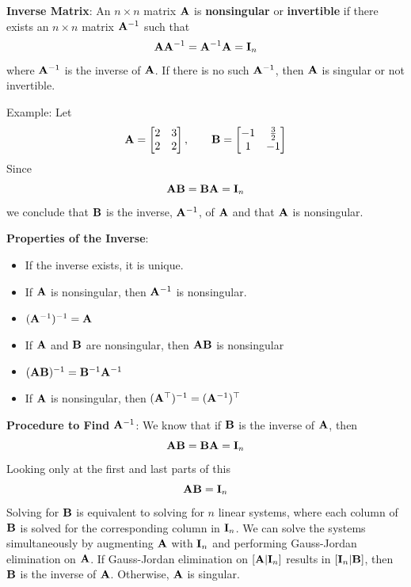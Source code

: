 \documentclass[
  letterpaper,
]{book}
\theoremstyle{definition}
\theoremstyle{definition}
\theoremstyle{plain}
\theoremstyle{definition}
\theoremstyle{plain}
\theoremstyle{plain}
\theoremstyle{remark}
\begin{document}
\textbf{Inverse Matrix}: An \(n\times n\) matrix \({\bf A}\) is
\textbf{nonsingular} or \textbf{invertible} if there exists an
\(n\times n\) matrix \({\bf A}^{-1}\) such that
\[{\bf A} {\bf A}^{-1} = {\bf A}^{-1} {\bf A} = {\bf I}_n\] where
\({\bf A}^{-1}\) is the inverse of \({\bf A}\). If there is no such
\({\bf A}^{-1}\), then \({\bf A}\) is singular or not invertible.

Example: Let
\[{\bf A} = \begin{bmatrix} 2&3\\2&2 \end{bmatrix}, \qquad {\bf B}=\begin{bmatrix} -1&\frac{3}{2}\\ 1&-1
        \end{bmatrix}\] Since
\[{\bf A} {\bf B} = {\bf B} {\bf A} = {\bf I}_n\] we conclude that
\({\bf B}\) is the inverse, \({\bf A}^{-1}\), of \({\bf A}\) and that
\({\bf A}\) is nonsingular.

\textbf{Properties of the Inverse}:

\begin{itemize}
\item
  If the inverse exists, it is unique.
\item
  If \({\bf A}\) is nonsingular, then \({\bf A}^{-1}\) is nonsingular.
\item
  \(({\bf A}^{-1})^{-1} = {\bf A}\)
\item
  If \({\bf A}\) and \({\bf B}\) are nonsingular, then
  \({\bf A}{\bf B}\) is nonsingular
\item
  \(({\bf A}{\bf B})^{-1} = {\bf B}^{-1}{\bf A}^{-1}\)
\item
  If \({\bf A}\) is nonsingular, then
  \(({\bf A}^\top)^{-1}=({\bf A}^{-1})^\top\)
\end{itemize}

\textbf{Procedure to Find} \({\bf A}^{-1}\): We know that if \({\bf B}\)
is the inverse of \({\bf A}\), then
\[{\bf A} {\bf B} = {\bf B} {\bf A} = {\bf I}_n\] Looking only at the
first and last parts of this \[{\bf A} {\bf B} = {\bf I}_n\] Solving for
\({\bf B}\) is equivalent to solving for \(n\) linear systems, where
each column of \({\bf B}\) is solved for the corresponding column in
\({\bf I}_n\). We can solve the systems simultaneously by augmenting
\({\bf A}\) with \({\bf I}_n\) and performing Gauss-Jordan elimination
on \({\bf A}\). If Gauss-Jordan elimination on \([{\bf A} | {\bf I}_n]\)
results in \([{\bf I}_n | {\bf B} ]\), then \({\bf B}\) is the inverse
of \({\bf A}\). Otherwise, \({\bf A}\) is singular.
\end{document}
